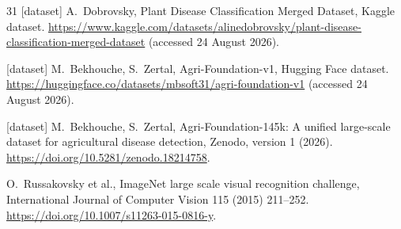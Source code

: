 \documentclass[preprint,12pt]{elsarticle}
\begin{document}
\begin{thebibliography}{31}
[dataset] A.~Dobrovsky, Plant Disease Classification Merged Dataset,
Kaggle dataset.
\url{https://www.kaggle.com/datasets/alinedobrovsky/plant-disease-classification-merged-dataset}
(accessed 24 August 2026).

[dataset] M.~Bekhouche, S.~Zertal, Agri-Foundation-v1,
Hugging Face dataset.
\url{https://huggingface.co/datasets/mbsoft31/agri-foundation-v1}
(accessed 24 August 2026).

[dataset] M.~Bekhouche, S.~Zertal, Agri-Foundation-145k: A unified large-scale
dataset for agricultural disease detection, Zenodo, version 1 (2026).
\url{https://doi.org/10.5281/zenodo.18214758}.

O.~Russakovsky et al., ImageNet large scale visual recognition challenge,
International Journal of Computer Vision 115 (2015) 211--252.
\url{https://doi.org/10.1007/s11263-015-0816-y}.

\end{thebibliography}
\end{document}
